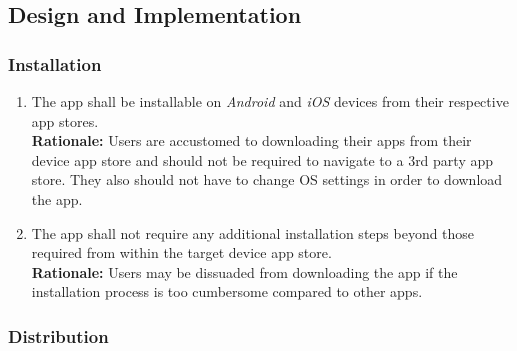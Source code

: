 \documentclass{article}
\begin{document}
\subsection{Design and Implementation}

\subsubsection{Installation}
\label{ssub:installation}


\begin{enumerate}[align=left, label=\textbf{DI-I\arabic*.}]
    \item The app shall be installable on \emph{Android} and \emph{iOS} devices from their respective app stores.\\
    {\bf Rationale:} Users are accustomed to downloading their apps from their device app store and should not be required to navigate to a 3rd party app store. They also should not have to change OS settings in order to download the app.
    \item The app shall not require any additional installation steps beyond those required from within the target device app store.\\
    {\bf Rationale:} Users may be dissuaded from downloading the app if the installation process is too cumbersome compared to other apps.
\end{enumerate}

\subsubsection{Distribution}
\label{ssub:distribution}

\end{document}
